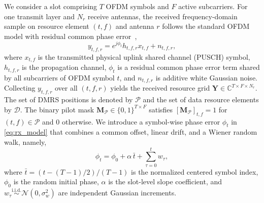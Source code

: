 \documentclass[conference,letterpaper]{IEEEtran}
\begin{document}
	We consider a slot comprising $T$ OFDM symbols and $F$ active subcarriers. For one transmit layer and $N_r$ receive antennas, the received frequency-domain sample on resource element $(t,f)$ and antenna $r$ follows the standard OFDM model with residual common phase error~\cite{pollet1995,wu2004},
	\begin{equation}
		\label{eq:rx_model}
		y_{t,f,r} = e^{j\phi_t} h_{t,f,r} x_{t,f} + n_{t,f,r},
	\end{equation}
	where $x_{t,f}$ is the transmitted physical uplink shared channel (PUSCH) symbol, $h_{t,f,r}$ is the propagation channel, $\phi_t$ is a residual common phase error term shared by all subcarriers of OFDM symbol $t$, and $n_{t,f,r}$ is additive white Gaussian noise. Collecting $y_{t,f,r}$ over all $(t,f,r)$ yields the received resource grid $\mathbf{Y}\in\mathbb{C}^{T\times F\times N_r}$.
	The set of DMRS positions is denoted by $\mathcal{P}$ and the set of data resource elements by $\mathcal{D}$. The binary pilot mask $\mathbf{M}_{\mathcal{P}}\in\{0,1\}^{T\times F}$ satisfies $[\mathbf{M}_{\mathcal{P}}]_{t,f}=1$ for $(t,f)\in\mathcal{P}$ and $0$ otherwise.
	We introduce a symbol-wise phase error $\phi_t$ in \eqref{eq:rx_model} that combines a common offset, linear drift, and a Wiener random walk, namely,
	\vspace{-.2cm}
	\begin{equation}
		\label{eq:phase_profile}
		\phi_t = \phi_0 + \alpha\, \bar{t} + \sum_{\tau=0}^{t} w_{\tau},
	\end{equation}
	where $\bar{t}=(t-(T-1)/2)/(T-1)$ is the normalized centered symbol index, $\phi_0$ is the random initial phase, $\alpha$ is the slot-level slope coefficient, and $w_{\tau}\overset{\mathrm{i.i.d.}}{\sim}\mathcal{N}(0,\sigma_w^2)$ are independent Gaussian increments.
	
	
\end{document}
